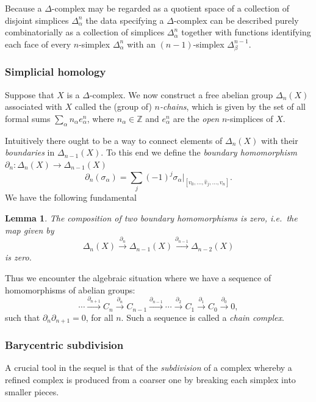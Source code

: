 \documentclass[12pt]{amsart}
\newtheorem{lemma}[theorem]{Lemma}
\theoremstyle{definition}
\theoremstyle{remark}
\numberwithin{equation}{section}
\begin{document}
Because a $\Delta$-complex may be regarded as a quotient space of a collection of disjoint simplices $\Delta_\alpha^n$ the data specifying a $\Delta$-complex can be described purely combinatorially as a collection of simplices $\Delta_\alpha^n$ together with functions identifying each face of every $n$-simplex $\Delta_\alpha^n$ with an $(n-1)$-simplex $\Delta_\beta^{n-1}$.

\subsubsection{Simplicial homology}
Suppose that $X$ is a $\Delta$-complex. We now construct a free abelian group $\Delta_n(X)$ associated with $X$ called the (group of) \emph{$n$-chains}, which is given by the set of all formal sums $\sum_\alpha n_\alpha e_\alpha^n$, where $n_\alpha \in \mathbb{Z}$ and $e_\alpha^n$ are the \emph{open} $n$-simplices of $X$. 

Intuitively there ought to be a way to connect elements of $\Delta_n(X)$ with their \emph{boundaries} in $\Delta_{n-1}(X)$. To this end we define the \emph{boundary homomorphism} $\partial_n:\Delta_n(X)\rightarrow \Delta_{n-1}(X)$
\begin{equation}
	\partial_n(\sigma_\alpha) = \sum_{j}(-1)^j \sigma_{\alpha}|_{[v_0, \ldots, \widehat{v}_j, \ldots, v_n]}.
\end{equation}
We have the following fundamental 
\begin{lemma}
	The composition of two boundary homomorphisms is zero, i.e.\ the map given by
	\begin{equation}
		\Delta_n(X) \overset{\partial_n}{\rightarrow} \Delta_{n-1}(X) \overset{\partial_{n-1}}{\rightarrow} \Delta_{n-2}(X)
	\end{equation}
	is zero.
\end{lemma}
Thus we encounter the algebraic situation where we have a sequence of homomorphisms of abelian groups:
\begin{equation}
	\cdots \overset{\partial_{n+1}}{\rightarrow} C_{n} \overset{\partial_{n}}{\rightarrow} C_{n-1} \overset{\partial_{n-1}}{\rightarrow} \cdots \overset{\partial_{2}}{\rightarrow} C_{1} \overset{\partial_{1}}{\rightarrow} C_{0} \overset{\partial_{0}}{\rightarrow} 0,
\end{equation}
such that $\partial_n\partial_{n+1} = 0$, for all $n$. Such a sequence is called a \emph{chain complex}.

\subsubsection{Barycentric subdivision}
A crucial tool in the sequel is that of the \emph{subdivision} of a complex whereby a refined complex is produced from a coarser one by breaking each simplex into smaller pieces.
\end{document}
